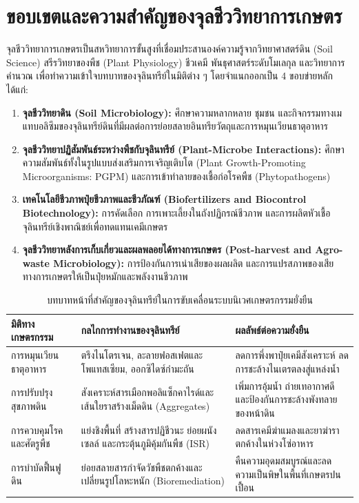 \section{ขอบเขตและความสำคัญของจุลชีววิทยาการเกษตร}

จุลชีววิทยาการเกษตรเป็นสหวิทยาการขั้นสูงที่เชื่อมประสานองค์ความรู้จากวิทยาศาสตร์ดิน (Soil Science) สรีรวิทยาของพืช (Plant Physiology) ชีวเคมี พันธุศาสตร์ระดับโมเลกุล และวิทยาการคำนวณ เพื่อทำความเข้าใจบทบาทของจุลินทรีย์ในมิติต่าง ๆ โดยจำแนกออกเป็น 4 ขอบข่ายหลักได้แก่:

\begin{enumerate}
    \item \textbf{จุลชีววิทยาดิน (Soil Microbiology):} ศึกษาความหลากหลาย ชุมชน และกิจกรรมทางเมแทบอลิซึมของจุลินทรีย์ดินที่มีผลต่อการย่อยสลายอินทรียวัตถุและการหมุนเวียนธาตุอาหาร
    \item \textbf{จุลชีววิทยาปฏิสัมพันธ์ระหว่างพืชกับจุลินทรีย์ (Plant-Microbe Interactions):} ศึกษาความสัมพันธ์ทั้งในรูปแบบส่งเสริมการเจริญเติบโต (Plant Growth-Promoting Microorganisms: PGPM) และการเข้าทำลายของเชื้อก่อโรคพืช (Phytopathogens)
    \item \textbf{เทคโนโลยีชีวภาพปุ๋ยชีวภาพและชีวภัณฑ์ (Biofertilizers and Biocontrol Biotechnology):} การคัดเลือก การเพาะเลี้ยงในถังปฏิกรณ์ชีวภาพ และการผลิตหัวเชื้อจุลินทรีย์เชิงพาณิชย์เพื่อทดแทนเคมีเกษตร
    \item \textbf{จุลชีววิทยาหลังการเก็บเกี่ยวและผลพลอยได้ทางการเกษตร (Post-harvest and Agro-waste Microbiology):} การป้องกันการเน่าเสียของผลผลิต และการแปรสภาพของเสียทางการเกษตรให้เป็นปุ๋ยหมักและพลังงานชีวภาพ
\end{enumerate}

\begin{table}[ht]
\centering
\small
\begin{tabular}{lp{4.2cm}p{4.2cm}}
\toprule
\textbf{มิติทางเกษตรกรรม} & \textbf{กลไกการทำงานของจุลินทรีย์} & \textbf{ผลลัพธ์ต่อความยั่งยืน} \\
\midrule
การหมุนเวียนธาตุอาหาร & ตรึงไนโตรเจน, ละลายฟอสเฟตและโพแทสเซียม, ออกซิไดซ์กำมะถัน & ลดการพึ่งพาปุ๋ยเคมีสังเคราะห์ ลดการชะล้างไนเตรตลงสู่แหล่งน้ำ \\
การปรับปรุงสุขภาพดิน & สังเคราะห์สารเมือกพอลิแซ็กคาไรด์และเส้นใยราสร้างเม็ดดิน (Aggregates) & เพิ่มการอุ้มน้ำ ถ่ายเทอากาศดี และป้องกันการชะล้างพังทลายของหน้าดิน \\
การควบคุมโรคและศัตรูพืช & แย่งชิงพื้นที่ สร้างสารปฏิชีวนะ ย่อยผนังเซลล์ และกระตุ้นภูมิคุ้มกันพืช (ISR) & ลดสารเคมีฆ่าแมลงและยาฆ่าราตกค้างในห่วงโซ่อาหาร \\
การบำบัดฟื้นฟูดิน & ย่อยสลายสารกำจัดวัชพืชตกค้างและเปลี่ยนรูปโลหะหนัก (Bioremediation) & คืนความอุดมสมบูรณ์และลดความเป็นพิษในพื้นที่เกษตรปนเปื้อน \\
\bottomrule
\end{tabular}
\caption{บทบาทหน้าที่สำคัญของจุลินทรีย์ในการขับเคลื่อนระบบนิเวศเกษตรกรรมยั่งยืน}
\label{tab:ch01_roles}
\end{table}

